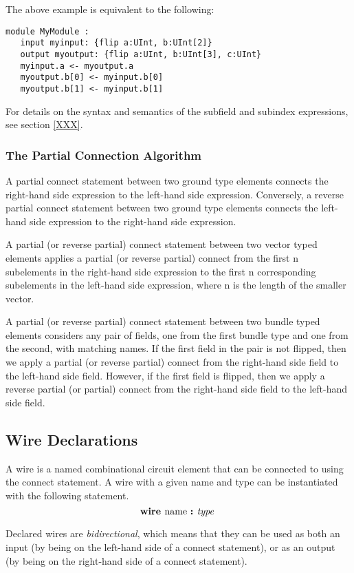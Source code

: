 \documentclass[12pt]{article}
\begin{document}
The above example is equivalent to the following:
\begin{verbatim}
module MyModule :
   input myinput: {flip a:UInt, b:UInt[2]}
   output myoutput: {flip a:UInt, b:UInt[3], c:UInt}
   myinput.a <- myoutput.a
   myoutput.b[0] <- myinput.b[0]
   myoutput.b[1] <- myinput.b[1]
\end{verbatim}
For details on the syntax and semantics of the subfield and subindex expressions, see section \ref{XXX}.

\subsubsection{The Partial Connection Algorithm}

A partial connect statement between two ground type elements connects the right-hand side expression to the left-hand side expression. Conversely, a reverse partial connect statement between two ground type elements connects the left-hand side expression to the right-hand side expression. 

A partial (or reverse partial) connect statement between two vector typed elements applies a partial (or reverse partial) connect from the first n subelements in the right-hand side expression to the first n corresponding subelements in the left-hand side expression, where n is the length of the smaller vector. 

A partial (or reverse partial) connect statement between two bundle typed elements considers any pair of fields, one from the first bundle type and one from the second, with matching names. If the first field in the pair is not flipped, then we apply a partial (or reverse partial) connect from the right-hand side field to the left-hand side field. However, if the first field is flipped, then we apply a reverse partial (or partial) connect from the right-hand side field to the left-hand side field. 

\subsection{Wire Declarations}
A wire is a named combinational circuit element that can be connected to using the connect statement.
A wire with a given name and type can be instantiated with the following statement.
\[
\text{\bf wire\ } \text{name } \text{\bf :\ } \text{\em type\ } \\
\]

Declared wires are {\em bidirectional}, which means that they can be used as both an input (by being on the left-hand side of a connect statement), or as an output (by being on the right-hand side of a connect statement).
\end{document}
